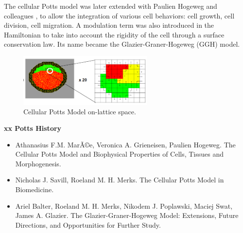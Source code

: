 The cellular Potts model was later extended with Paulien Hogeweg and colleagues \cite{Balter:2007fc}, \cite{Maree:2007hc} to allow the integration of various cell behaviors: cell growth, cell division, cell migration. A modulation term was also introduced in the Hamiltonian to take into account the rigidity of the cell through a surface conservation law. Its name became the Glazier-Graner-Hogeweg (GGH) model.
\begin{figure}
\begin{center}
\includegraphics[width=0.6\textwidth]{../../images/CPM/onlattice_potts.png}
\end{center}
\caption{Cellular Potts Model on-lattice space.}
\label{CPM_onlattice_potts.png}
\end{figure}

\textbf{xx Potts History}
\begin{itemize}
	\item Athanasius F.M. MarÃ©e, Veronica A. Grieneisen, Paulien Hogeweg. The Cellular Potts Model and Biophysical Properties of Cells, Tissues and Morphogenesis. \cite{Maree:2007hc}
	\item Nicholas J. Savill, Roeland M. H. Merks. The Cellular Potts Model in Biomedicine. \cite{Savill:2007fm}
	\item Ariel Balter, Roeland M. H. Merks, Nikodem J. Poplawski, Maciej Swat, James A. Glazier. The Glazier-Graner-Hogeweg Model: Extensions, Future Directions, and Opportunities for Further Study. \cite{Balter:2007fc}
\end{itemize}

